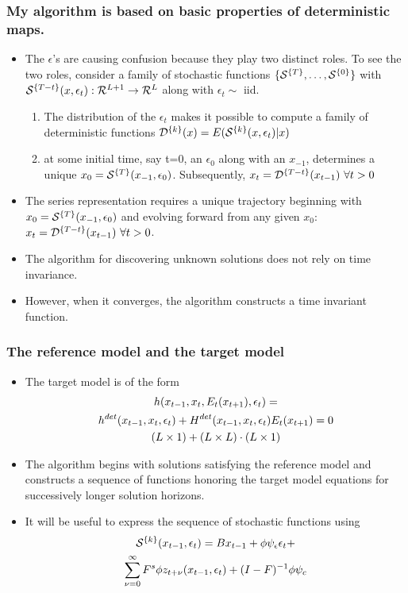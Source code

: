 \documentclass[letter]{beamer}
\begin{document}
\begin{frame}
  \frametitle{My algorithm is based on basic properties of deterministic maps.}
  \begin{itemize}
  \item     The $\epsilon$'s are causing 
confusion because they play two distinct roles.
To see the two roles, consider a family of stochastic functions 
$\{\stochF{T},\ldots,\stochF{0}\}$ with 
$\stochF{T-t}(x,\epsilon_t): {\mathcal{R}}^{L+1} \rightarrow \mathcal{R}^L$ along with $\epsilon_t \sim $ iid.
    \begin{enumerate}
\item The distribution of the $\epsilon_t$ makes it possible to compute 
a family of deterministic functions $\detF{k}(x)=E( \stochF{k}(x,\epsilon_t)|x) $
    \item at some initial time, say t=0, an $\epsilon_0$ 
along with an $x_{-1}$, determines a unique $x_0=\stochF{T}(x_{-1},\epsilon_0)$.
Subsequently, $x_{t}=\detF{{T-t}}(x_{t-1})\,\, \forall t>0$
    \end{enumerate}
 \item The series representation requires a unique trajectory beginning with $x_0=\stochF{T}(x_{-1},\epsilon_0)$ and 
evolving forward from any given $x_0$:  $x_t=\detF{T-t}(x_{t-1})\,\, \forall t>0$. 
  \item The algorithm for discovering unknown solutions does not rely on time invariance. 
\item However, when it converges, the algorithm constructs a time invariant function.
  \end{itemize}
    
  \end{frame}


\begin{frame}
\frametitle{The reference model and the target model}
\begin{itemize}
\item The target model is of the form
\begin{gather*}
\nlEqnLHS{x_{t-1}}{x_t}{x_{t+1}}{t}=\\
\nlEqn{x_{t-1}}{x_t}{x_{t+1}}{t}=0\\
 (L \times 1) +  (L \times L ) \cdot (L \times 1)
\end{gather*}
\item The algorithm begins with solutions satisfying 
the reference model and
constructs a sequence of functions
 honoring the target model equations for successively 
longer solution horizons.

\item It will be useful to express the sequence of stochastic 
functions using
  \begin{gather*}
	 \stochF{k}(x_{t-1},\epsilon_t) =B x_{t-1}+ \phi \psi_\epsilon\epsilon_t + \\ \sum_{\sForSum=0}^\infty F^s \phi z_{t+\sForSum}(x_{t-1},\epsilon_t) + (I - F)^{-1} \phi \psi_c
\label{theSeries}
  \end{gather*}
  \end{itemize}
\end{frame}
\end{document}
